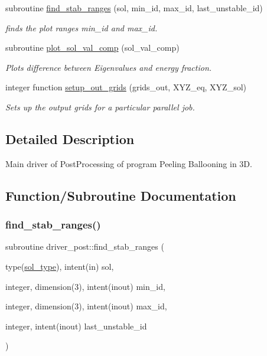 \begin{DoxyCompactItemize}
subroutine \hyperlink{namespacedriver__post_a51ecad1032e415d2a8e6e5b97d2c7e09}{find\+\_\+stab\+\_\+ranges} (sol, min\+\_\+id, max\+\_\+id, last\+\_\+unstable\+\_\+id)
\begin{DoxyCompactList}\small\item\em finds the plot ranges {\ttfamily min\+\_\+id} and {\ttfamily max\+\_\+id}. \end{DoxyCompactList}\item 
subroutine \hyperlink{namespacedriver__post_af9ce961d2d6825b767a93fdbe8806a1c}{plot\+\_\+sol\+\_\+val\+\_\+comp} (sol\+\_\+val\+\_\+comp)
\begin{DoxyCompactList}\small\item\em Plots difference between Eigenvalues and energy fraction. \end{DoxyCompactList}\item 
integer function \hyperlink{namespacedriver__post_a3438685c5fb7302f756c368fb5f940ee}{setup\+\_\+out\+\_\+grids} (grids\+\_\+out, X\+Y\+Z\+\_\+eq, X\+Y\+Z\+\_\+sol)
\begin{DoxyCompactList}\small\item\em Sets up the output grids for a particular parallel job. \end{DoxyCompactList}\end{DoxyCompactItemize}


\subsection{Detailed Description}
Main driver of Post\+Processing of program Peeling Ballooning in 3D. 

\subsection{Function/\+Subroutine Documentation}
\mbox{\label{namespacedriver__post_a51ecad1032e415d2a8e6e5b97d2c7e09}} 
\subsubsection{\texorpdfstring{find\+\_\+stab\+\_\+ranges()}{find\_stab\_ranges()}}
{\footnotesize\ttfamily subroutine driver\+\_\+post\+::find\+\_\+stab\+\_\+ranges (\begin{DoxyParamCaption}\item[{type(\hyperlink{structsol__vars_1_1sol__type}{sol\+\_\+type}), intent(in)}]{sol,  }\item[{integer, dimension(3), intent(inout)}]{min\+\_\+id,  }\item[{integer, dimension(3), intent(inout)}]{max\+\_\+id,  }\item[{integer, intent(inout)}]{last\+\_\+unstable\+\_\+id }\end{DoxyParamCaption})}



